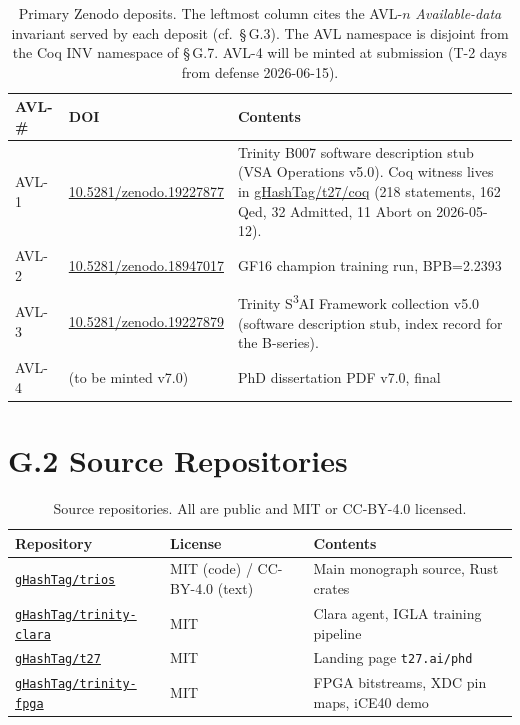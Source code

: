 \begin{table}[h]
\centering
\begin{tabular}{lll}
\toprule
\textbf{AVL-\#} & \textbf{DOI} & \textbf{Contents} \\
\midrule
AVL-1 & \href{https://doi.org/10.5281/zenodo.19227877}{10.5281/zenodo.19227877}
  & Trinity B007 software description stub (VSA Operations v5.0). Coq witness lives in \href{https://github.com/gHashTag/t27/tree/main/coq}{gHashTag/t27/coq} (218 statements, 162 Qed, 32 Admitted, 11 Abort on 2026-05-12). \\
AVL-2 & \href{https://doi.org/10.5281/zenodo.18947017}{10.5281/zenodo.18947017}
  & GF16 champion training run, BPB=2.2393 \\
AVL-3 & \href{https://doi.org/10.5281/zenodo.19227879}{10.5281/zenodo.19227879}
  & Trinity S\textsuperscript{3}AI Framework collection v5.0 (software description stub, index record for the B-series). \\
AVL-4 & (to be minted v7.0) & PhD dissertation PDF v7.0, final \\
\bottomrule
\end{tabular}
\caption{Primary Zenodo deposits. The leftmost column cites the AVL-$n$ \emph{Available-data} invariant served by each deposit (cf.\ \S\,G.3). The AVL namespace is disjoint from the Coq INV namespace of \S\,G.7. AVL-4 will be minted
  at submission (T-2 days from defense 2026-06-15).}
\end{table}

\section*{G.2 Source Repositories}

\begin{table}[h]
\centering
\begin{tabular}{lll}
\toprule
\textbf{Repository} & \textbf{License} & \textbf{Contents} \\
\midrule
\href{https://github.com/gHashTag/trios}{\texttt{gHashTag/trios}}
  & MIT (code) / CC-BY-4.0 (text) & Main monograph source, Rust crates \\
\href{https://github.com/gHashTag/trinity-clara}{\texttt{gHashTag/trinity-clara}}
  & MIT & Clara agent, IGLA training pipeline \\
\href{https://github.com/gHashTag/t27}{\texttt{gHashTag/t27}}
  & MIT & Landing page \texttt{t27.ai/phd} \\
\href{https://github.com/gHashTag/trinity-fpga}{\texttt{gHashTag/trinity-fpga}}
  & MIT & FPGA bitstreams, XDC pin maps, iCE40 demo \\
\bottomrule
\end{tabular}
\caption{Source repositories. All are public and MIT or CC-BY-4.0 licensed.}
\end{table}


